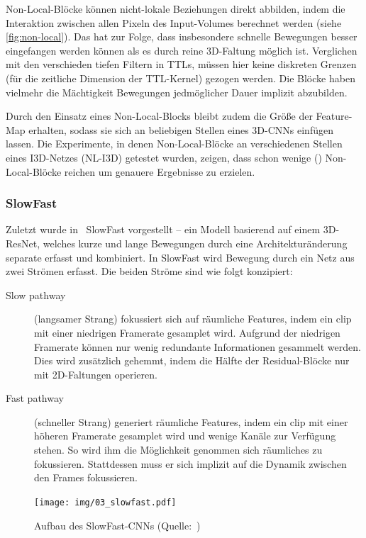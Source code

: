Non-Local-Blöcke können nicht-lokale Beziehungen direkt abbilden, indem die Interaktion zwischen allen Pixeln des Input-Volumes berechnet werden (siehe \autoref{fig:non-local}).
Das hat zur Folge, dass insbesondere schnelle Bewegungen besser eingefangen werden können als es durch reine 3D-Faltung möglich ist.
Verglichen mit den verschieden tiefen Filtern in TTLs, müssen hier keine diskreten Grenzen (für die zeitliche Dimension der TTL-Kernel) gezogen werden.
Die Blöcke haben vielmehr die Mächtigkeit Bewegungen jedmöglicher Dauer implizit abzubilden.

Durch den Einsatz eines Non-Local-Blocks bleibt zudem die Größe der Feature-Map erhalten, sodass sie sich an beliebigen Stellen eines 3D-CNNs einfügen lassen.
Die Experimente, in denen Non-Local-Blöcke an verschiedenen Stellen eines I3D-Netzes (NL-I3D) getestet wurden, zeigen, dass schon wenige () Non-Local-Blöcke reichen um genauere Ergebnisse zu erzielen.

\subsubsection*{SlowFast}

Zuletzt wurde in~\cite{Feichtenhofer18} SlowFast vorgestellt -- ein Modell basierend auf einem 3D-ResNet, welches kurze und lange Bewegungen durch eine Architekturänderung separate erfasst und kombiniert.
In SlowFast wird Bewegung durch ein Netz aus zwei Strömen erfasst.
Die beiden Ströme sind wie folgt konzipiert:

\begin{description}
    \item[Slow pathway]
    (langsamer Strang) fokussiert sich auf räumliche Features, indem ein \gls{clip} mit einer niedrigen Framerate gesamplet wird.
    Aufgrund der niedrigen Framerate können nur wenig redundante Informationen gesammelt werden.
    Dies wird zusätzlich gehemmt, indem die Hälfte der Residual-Blöcke nur mit 2D-Faltungen operieren.
    \item[Fast pathway]
    (schneller Strang) generiert räumliche Features, indem ein \gls{clip} mit einer höheren Framerate gesamplet wird und wenige Kanäle zur Verfügung stehen.
    So wird ihm die Möglichkeit genommen sich räumliches zu fokussieren.
    Stattdessen muss er sich implizit auf die Dynamik zwischen den Frames fokussieren.
\end{description}

\begin{figure}[h!]
    \centering
    \texttt{[image: img/03\_slowfast.pdf]}
    \caption[Aufbau des SlowFast-CNNs]{Aufbau des SlowFast-CNNs (Quelle:~\cite{Feichtenhofer18})}
    \label{fig:slowfast}
\end{figure}

